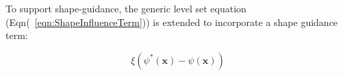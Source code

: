 \documentclass{InsightArticle}
\begin{document}
%
%


To support shape-guidance, the generic level set equation
(Eqn(~\ref{eqn:ShapeInfluenceTerm})) is extended to incorporate a shape guidance
term:

\begin{equation}
\label{eqn:ShapeInfluenceTerm}
\xi \left(\psi^{*}(\mathbf{x}) - \psi(\mathbf{x})\right)
\end{equation}




%
%



\end{document}
